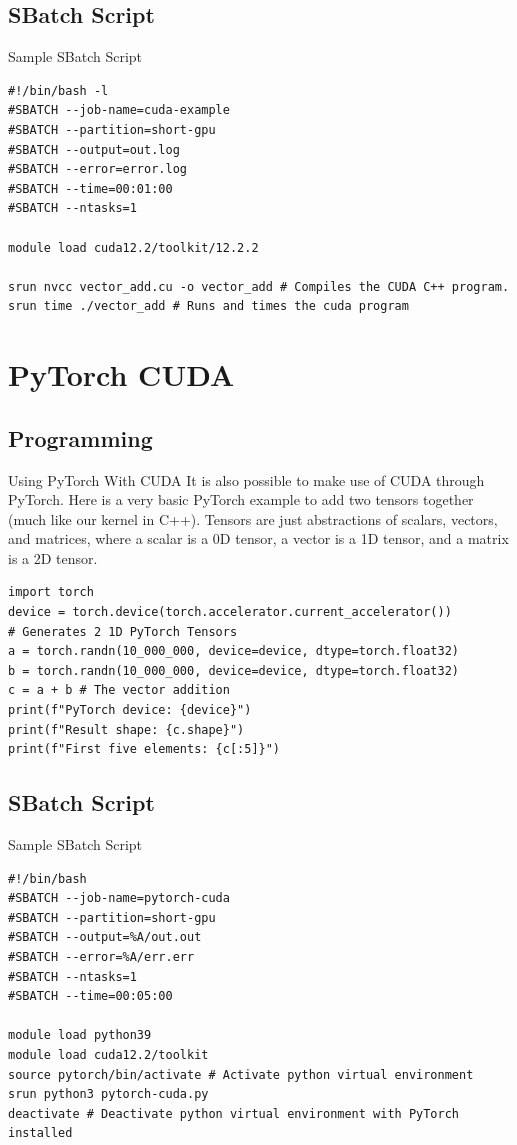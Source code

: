 \documentclass[aspectratio=169]{beamer}
\begin{document}
\subsection{SBatch Script}
\begin{frame}[fragile]{Sample SBatch Script}
	\begin{verbatim}
#!/bin/bash -l
#SBATCH --job-name=cuda-example
#SBATCH --partition=short-gpu
#SBATCH --output=out.log
#SBATCH --error=error.log
#SBATCH --time=00:01:00
#SBATCH --ntasks=1

module load cuda12.2/toolkit/12.2.2

srun nvcc vector_add.cu -o vector_add # Compiles the CUDA C++ program.
srun time ./vector_add # Runs and times the cuda program
	\end{verbatim}
\end{frame}

\section{PyTorch CUDA}
\subsection{Programming}
\begin{frame}[fragile]{Using PyTorch With CUDA}
	It is also possible to make use of CUDA through PyTorch. Here is a very basic PyTorch example to add two tensors together (much like our kernel in C++). Tensors are just abstractions of scalars, vectors, and matrices, where a scalar is a 0D tensor, a vector is a 1D tensor, and a matrix is a 2D tensor.

	\begin{verbatim}
import torch
device = torch.device(torch.accelerator.current_accelerator())
# Generates 2 1D PyTorch Tensors
a = torch.randn(10_000_000, device=device, dtype=torch.float32)
b = torch.randn(10_000_000, device=device, dtype=torch.float32)
c = a + b # The vector addition
print(f"PyTorch device: {device}")
print(f"Result shape: {c.shape}")
print(f"First five elements: {c[:5]}")
	\end{verbatim}
\end{frame}

\subsection{SBatch Script}

\begin{frame}[fragile]{Sample SBatch Script}
	\begin{verbatim}
#!/bin/bash
#SBATCH --job-name=pytorch-cuda
#SBATCH --partition=short-gpu
#SBATCH --output=%A/out.out
#SBATCH --error=%A/err.err
#SBATCH --ntasks=1
#SBATCH --time=00:05:00

module load python39
module load cuda12.2/toolkit
source pytorch/bin/activate # Activate python virtual environment 
srun python3 pytorch-cuda.py
deactivate # Deactivate python virtual environment with PyTorch installed
	\end{verbatim}
\end{frame}

\end{document}
